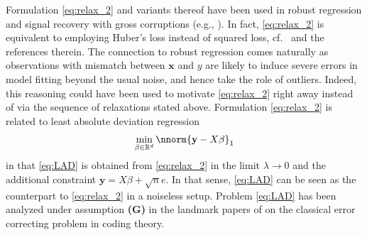 \documentclass[11pt]{article}
\def\R{\mathbb{R}}
\def\y{\mathbf{y}}
\begin{document}
Formulation \eqref{eq:relax_2} and variants thereof have been used in robust regression and signal recovery with gross corruptions (e.g., \cite{Laska2009, Nguyen2013, She2012, FoygelMackey}). In fact, \eqref{eq:relax_2} is equivalent to employing Huber's loss \cite{Huber1964} instead of squared loss, cf.~\cite{She2012} and the references therein. The connection to robust regression comes naturally as observations with mismatch between $\mathbf{x}$ and $y$ are likely to induce severe errors in model fitting beyond the usual noise, and hence take the role of outliers. Indeed, this reasoning could have been used to motivate \eqref{eq:relax_2} right away instead of via the sequence of relaxations stated above. Formulation \eqref{eq:relax_2} is related to least absolute deviation regression
\begin{equation}\label{eq:LAD}
 \min_{\beta \in \R^d} \nnorm{\y - X \beta}_1 
\end{equation}
in that \eqref{eq:LAD} is obtained from \eqref{eq:relax_2} in the limit $\lambda \rightarrow 0$ and the additional constraint
$\y = X \beta + \sqrt{n} e$. In that sense, \eqref{eq:LAD} can be seen as the counterpart to \eqref{eq:relax_2} in a noiseless setup. Problem \eqref{eq:LAD} has been analyzed under assumption \textbf{(G)} in the landmark papers of \cite{CandesTao2005, RudelsonVershynin2005} on the classical error correcting problem in coding theory. 
\end{document}
